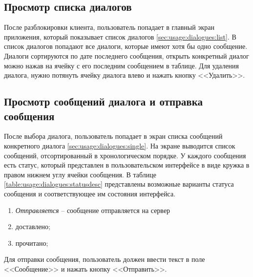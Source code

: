 \subsection{Просмотр списка диалогов}
\label{sec:usage:dialogues}

После разблокировки клиента, пользователь попадает в главный экран приложения, который показывает список диалогов \ref{sec:usage:dialogues:list}. В список диалогов попадают все диалоги, которые имеют хотя бы одно сообщение. Диалоги сортируются по дате последнего сообщения, открыть конкретный диалог можно нажав на ячейку с его последним сообщением в таблице. Для удаления диалога, нужно потянуть ячейку диалога влево и нажать кнопку <<Удалить>>.

\subsection{Просмотр сообщений диалога и отправка сообщения}
\label{sec:usage:dialogue}

После выбора диалога, пользователь попадает в экран списка сообщений конкретного диалога \ref{sec:usage:dialogues:single}. На экране выводится список сообщений, отсортированный в хронологическом порядке. У каждого сообщения есть статус, который представлен в пользовательском интерфейсе в виде кружка в правом нижнем углу ячейки сообщения. В таблице \ref{table:usage:dialogues:statusdesc} представлены возможные варианты статуса сообщения и соответствующее им состояния интерфейса.

\begin{enumerate}
	\item \textit{Отправляется} -- сообщение отправляется на сервер
	\item доставлено;
	\item прочитано;
\end{enumerate}

Для отправки сообщения, пользователь должен ввести текст в поле <<Сообщение>> и нажать кнопку <<Отправить>>.


